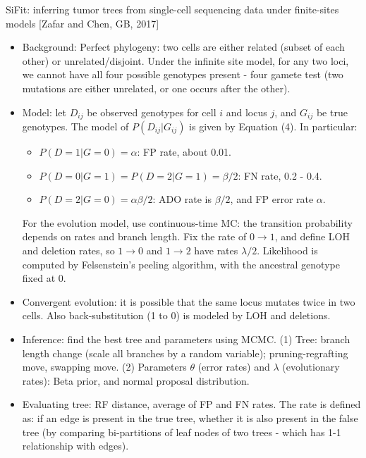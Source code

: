 \documentclass{report}
\begin{document}
SiFit: inferring tumor trees from single-cell sequencing data under finite-sites models [Zafar and Chen, GB, 2017]
\begin{itemize}
	\item Background: Perfect phylogeny: two cells are either related (subset of each other) or unrelated/disjoint. Under the infinite site model, for any two loci, we cannot have all four possible genotypes present - four gamete test (two mutations are either unrelated, or one occurs after the other). 
	
	\item Model: let $D_{ij}$ be observed genotypes for cell $i$ and locus $j$, and $G_{ij}$ be true genotypes. The model of $P(D_{ij}|G_{ij})$ is given by Equation (4). In particular: 
	\begin{itemize}
		\item $P(D = 1|G=0) = \alpha$: FP rate, about 0.01. 
		\item $P(D = 0|G=1) = P(D=2|G=1) = \beta / 2$: FN rate, 0.2 - 0.4.  
		\item $P(D = 2|G = 0) = \alpha \beta / 2$: ADO rate is $\beta/2$, and FP error rate $\alpha$. 
	\end{itemize} 
	For the evolution model, use continuous-time MC: the transition probability depends on rates and branch length. Fix the rate of $0 \rightarrow 1$, and define LOH and deletion rates, so $1 \rightarrow 0$ and $1 \rightarrow 2$ have rates $\lambda / 2$. Likelihood is computed by Felsenstein's peeling algorithm, with the ancestral genotype fixed at 0. 
	
	\item Convergent evolution: it is possible that the same locus mutates twice in two cells. Also back-substitution (1 to 0) is modeled by LOH and deletions. 
	
	\item Inference: find the best tree and parameters using MCMC. (1) Tree: branch length change (scale all branches by a random variable); pruning-regrafting move, swapping move. (2) Parameters $\theta$ (error rates) and $\lambda$ (evolutionary rates): Beta prior, and normal proposal distribution. 
	
	\item Evaluating tree: RF distance, average of FP and FN rates. The rate is defined as: if an edge is present in the true tree, whether it is also present in the false tree (by comparing bi-partitions of leaf nodes of two trees - which has 1-1 relationship with edges). 
	

\end{itemize}
\end{document}
